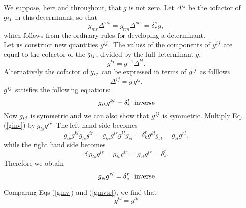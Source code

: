 
We suppose, here and throughout, that $g$ is not zero. Let $\Delta^{ij}$ be the cofactor of $g_{ij}$ in this determinant, so that 
$$g_{mr} \Delta^{ms} = g_{rm}\Delta^{sm} = \delta^s_r\, g,$$ which follows from the ordinary rules for developing a determinant. \\
 
Let us construct new quantities $g^{ij}$\cite{Bergmann}. 
The values of the components of $g^{ij}$ are equal to the cofactor of the $g_{ij}$, divided by the full determinant $g$,
\begin{equation} g^{kl} = g^{-1} \Delta^{kl}.  \label{ginveq} \end{equation} Alternatively the cofactor of $g_{ij}$ can be expressed in terms of $g^{ij}$ as folllows
\begin{equation} \Delta^{ij} = g\,g^{ij}\label{cofactor}. \end{equation}
$g^{ij}$ satisfies the following equations:
\begin{equation}
g_{ik}g^{kl}  = \delta^l_i \label{ginv}\hbox{~~inverse}
\end{equation}
Now $g_{ij}$ is symmetric and we can also show that $g^{ij}$ is symmetric. Multiply Eq. (\ref{ginv}) by $g_{ls}g^{ir}$. The left hand side becomes
\[ g_{ik}g^{kl} g_{ls}g^{ir} =g_{ki}g^{ir} g^{kl}g_{sl} = \delta^r_k g^{kl} g_{sl} = g_{sl}g^{rl}, \] while the right hand side becomes
\[ \delta^l_i g_{ls}g^{ir} = g_{is}g^{ir} = g_{si}g^{ir} = \delta^r_s.\] Therefore we obtain 
\begin{equation}
g_{sl}g^{rl} = \delta^r_s \hbox{~~inverse}\label{ginvtr}
\end{equation}

Comparing Eqs (\ref{ginv}) and (\ref{ginvtr}), we find that
\[ g^{kl} = g^{lk} \]

